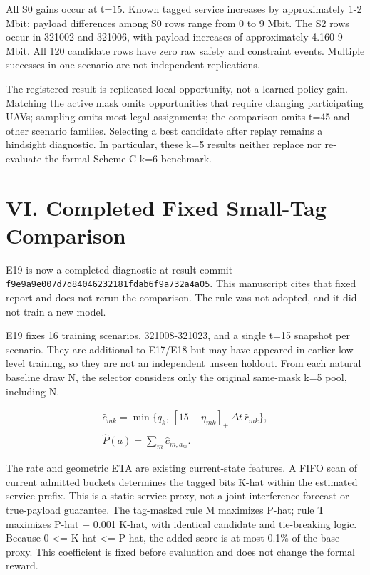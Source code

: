 All S0 gains occur at t=15. Known tagged service increases by approximately 1-2 Mbit; payload differences among S0 rows range from 0 to 9 Mbit. The S2 rows occur in 321002 and 321006, with payload increases of approximately 4.160-9 Mbit. All 120 candidate rows have zero raw safety and constraint events. Multiple successes in one scenario are not independent replications.

The registered result is replicated local opportunity, not a learned-policy gain. Matching the active mask omits opportunities that require changing participating UAVs; sampling omits most legal assignments; the comparison omits t=45 and other scenario families. Selecting a best candidate after replay remains a hindsight diagnostic. In particular, these k=5 results neither replace nor re-evaluate the formal Scheme C k=6 benchmark.

\section*{VI. Completed Fixed Small-Tag Comparison}

E19 is now a completed diagnostic at result commit \nolinkurl{f9e9a9e007d7d84046232181fdab6f9a732a4a05}. This manuscript cites that fixed report and does not rerun the comparison. The rule was not adopted, and it did not train a new model.

E19 fixes 16 training scenarios, 321008-321023, and a single t=15 snapshot per scenario. They are additional to E17/E18 but may have appeared in earlier low-level training, so they are not an independent unseen holdout. From each natural baseline draw N, the selector considers only the original same-mask k=5 pool, including N.

\begin{equation*}
\begin{gathered}
\widehat c_{mk}=\min\{q_k,\,[15-\eta_{mk}]_+\,\Delta t\,\widehat r_{mk}\},\\ \widehat P(a)=\sum_m\widehat c_{m,a_m}.
\end{gathered}
\end{equation*}

The rate and geometric ETA are existing current-state features. A FIFO scan of current admitted buckets determines the tagged bits K-hat within the estimated service prefix. This is a static service proxy, not a joint-interference forecast or true-payload guarantee. The tag-masked rule M maximizes P-hat; rule T maximizes P-hat + 0.001 K-hat, with identical candidate and tie-breaking logic. Because 0 <= K-hat <= P-hat, the added score is at most 0.1\% of the base proxy. This coefficient is fixed before evaluation and does not change the formal reward.

